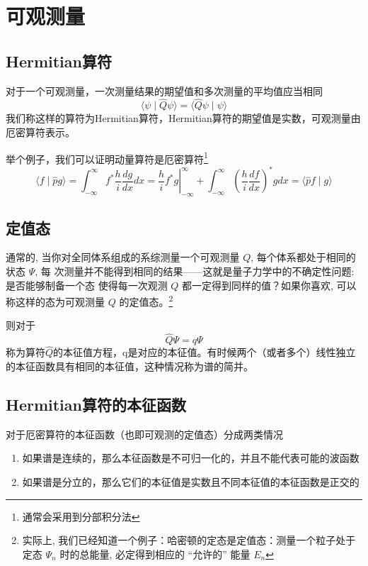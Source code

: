 \section{可观测量}
	\subsection{Hermitian算符}
		对于一个可观测量，一次测量结果的期望值和多次测量的平均值应当相同
		\begin{equation}
			\langle\psi \mid \hat{Q} \psi\rangle=\langle\hat{Q} \psi \mid \psi\rangle
		\end{equation}
		我们称这样的算符为Hermitian算符，Hermitian算符的期望值是实数，可观测量由厄密算符表示。

		举个例子，我们可以证明动量算符是厄密算符\footnote{通常会采用到分部积分法}
		\begin{equation}
			\langle f \mid \hat{p} g\rangle=\int_{-\infty}^{\infty} f^{*} \frac{h}{i} \frac{d g}{d x} d x=\left.\frac{h}{i} f^{*} g\right|_{-\infty} ^{\infty}+\int_{-\infty}^{\infty}\left(\frac{h}{i} \frac{d f}{d x}\right)^{*} g d x=\langle\hat{p} f \mid g\rangle
		\end{equation}
	\subsection{定值态}
		通常的, 当你对全同体系组成的系综测量一个可观测量 $Q$, 每个体系都处于相同的状态 $\Psi$, 每 次测量并不能得到相同的结果——这就是量子力学中的不确定性问题: 是否能够制备一个态 使得每一次观测 $Q$ 都一定得到同样的值？如果你喜欢, 可以称这样的态为可观测量 $Q$ 的定值态。\footnote{实际上, 我们已经知道一个例子：哈密顿的定态是定值态：测量一个粒子处于定态 $\Psi_{n}$ 时的总能量, 必定得到相应的 “允许的” 能量 $E_{n}$}

		则对于
		\begin{equation}
			\hat{Q} \Psi=q \Psi
		\end{equation}
		称为算符$\hat{Q}$的本征值方程，q是对应的本征值。有时候两个（或者多个）线性独立的本征函数具有相同的本征值，这种情况称为谱的简并。

	\subsection{Hermitian算符的本征函数}
		对于厄密算符的本征函数（也即可观测的定值态）分成两类情况
			\begin{enumerate}
			\item 如果谱是连续的，那么本征函数是不可归一化的，并且不能代表可能的波函数 
			\item 如果谱是分立的，那么它们的本征值是实数且不同本征值的本征函数是正交的
			\end{enumerate}

